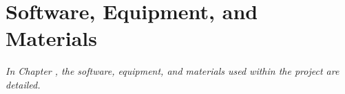 \chapter{Software, Equipment, and Materials}
\label{chapter:components}

\textit{In Chapter \thechapter, the software, equipment, and materials used within the project are detailed.}



